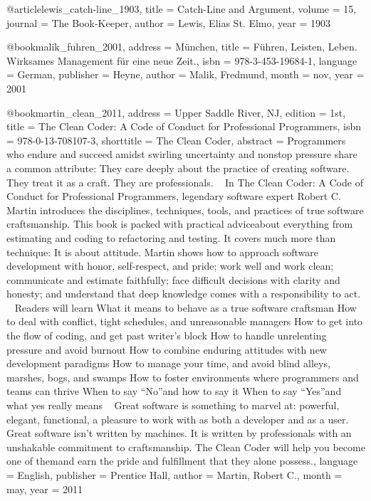 {@article{lewis_catch-line_1903,
  title   = {Catch-{Line} and {Argument}},
  volume  = {15},
  journal = {The Book-Keeper},
  author  = {Lewis, Elias St. Elmo},
  year    = {1903}
}

@book{malik_fuhren_2001,
  address   = {M{\"u}nchen},
  title     = {F{\"u}hren, {Leisten}, {Leben}. {Wirksames} {Management} f{\"u}r eine neue {Zeit}.},
  isbn      = {978-3-453-19684-1},
  language  = {German},
  publisher = {Heyne},
  author    = {Malik, Fredmund},
  month     = nov,
  year      = {2001}
}

@book{martin_clean_2011,
  address    = {Upper Saddle River, NJ},
  edition    = {1st},
  title      = {The {Clean} {Coder}: {A} {Code} of {Conduct} for {Professional} {Programmers}},
  isbn       = {978-0-13-708107-3},
  shorttitle = {The {Clean} {Coder}},
  abstract   = {Programmers who endure and succeed amidst swirling uncertainty and nonstop pressure share a common attribute: They care deeply about the practice of creating software. They treat it as a craft. They are professionals.  ~  In  The Clean Coder: A Code of Conduct for Professional Programmers,  legendary software expert Robert C. Martin introduces the disciplines, techniques, tools, and practices of true software craftsmanship. This book is packed with practical advice{\textendash}about everything from estimating and coding to refactoring and testing. It covers much more than technique: It is about attitude. Martin shows how to approach software development with honor, self-respect, and pride; work well and work clean; communicate and estimate faithfully; face difficult decisions with clarity and honesty; and understand that deep knowledge comes with a responsibility to act.  ~  Readers will learn    What it means to behave as a true software craftsman   How to deal with conflict, tight schedules, and unreasonable managers   How to get into the flow of coding, and get past writer{\textquoteright}s block   How to handle unrelenting pressure and avoid burnout   How to combine enduring attitudes with new development paradigms   How to manage your time, and avoid blind alleys, marshes, bogs, and swamps   How to foster environments where programmers and teams can thrive   When to say {\textquotedblleft}No{\textquotedblright}{\textendash}and how to say it   When to say {\textquotedblleft}Yes{\textquotedblright}{\textendash}and what yes really means   ~  Great software is something to marvel at: powerful, elegant, functional, a pleasure to work with as both a developer and as a user. Great software isn{\textquoteright}t written by machines. It is written by professionals with an unshakable commitment to craftsmanship.  The Clean Coder  will help you become one of them{\textendash}and earn the pride and fulfillment that they alone possess.},
  language   = {English},
  publisher  = {Prentice Hall},
  author     = {Martin, Robert C.},
  month      = may,
  year       = {2011}
}

}
